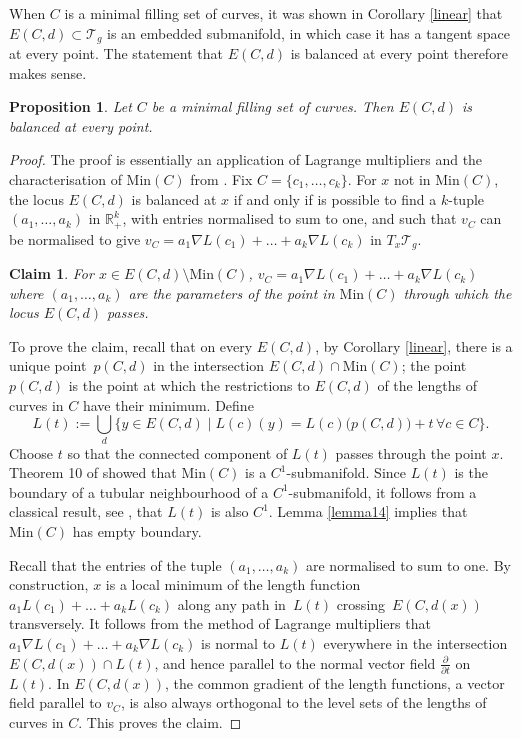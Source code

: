 \documentclass[11pt]{article}
\numberwithin{equation}{section}
\numberwithin{equation}{section}
\newtheorem{Proposition}[Theorem]{Proposition}
\newtheorem*{Claim}{Claim}
{ \theoremstyle{definition}
 \newtheorem{Definition}[Theorem]{Definition}
 \newtheorem{Note}[Theorem]{Note}
 \newtheorem{Example}[Theorem]{Example}
 \newtheorem{Remark}[Theorem]{Remark}
 \newtheorem{observation}[Theorem]{Observation}
}
\begin{document}
\begin{Remark}
When $C$ is a minimal filling set of curves, it was shown in Corollary \ref{linear} that~${E(C,d)\subset \mathcal{T}_{g}}$ is an embedded submanifold, in which case it has a tangent space at every point. The statement that $E(C,d)$ is balanced at every point therefore makes sense.
\end{Remark}
\begin{Proposition}
\label{balancedlem}
Let $C$ be a minimal filling set of curves. Then $E(C,d)$ is balanced at every point.
\end{Proposition}
\begin{proof}
The proof is essentially an application of Lagrange multipliers and the characterisation of $\mathrm{Min}(C)$ from \cite{SchmutzMorse}. Fix $C=\{c_{1}, \dots, c_{k}\}$. For $x$ not in $\mathrm{Min}(C)$, the locus $E(C,d)$ is balanced at $x$ if and only if is possible to find a $k$-tuple $(a_{1}, \dots, a_{k})$ in $\mathbb{R}_{+}^{k}$, with entries normalised to sum to one, and such that $v_{C}$ can be normalised to give $v_{C}=a_{1}\nabla L(c_{1})+\dots+a_{k}\nabla L(c_{k})$ in $T_{x}\mathcal{T}_{g}$.

\begin{Claim} For $x\in E(C,d)\setminus \mathrm{Min}(C)$, $v_{C}=a_{1}\nabla L(c_{1})+\dots+a_{k}\nabla L(c_{k})$ where $(a_{1}, \dots, a_{k})$ are the parameters of the point in $\mathrm{Min}(C)$ through which the locus $E(C,d)$ passes.
\end{Claim}

To prove the claim, recall that on every $E(C, d)$, by Corollary \ref{linear}, there is a unique point~$p(C,d)$ in the intersection $E(C,d)\cap\mathrm{Min}(C)$; the point $p(C,d)$ is the point at which the restrictions to $E(C,d)$ of the lengths of curves in $C$ have their minimum. Define
\begin{equation*}
 L(t):=\bigcup_{d}\{y\in E(C,d) \mid L(c)(y)=L(c)\bigl(p(C,d)\bigr)+t \, \forall c\in C\}.
\end{equation*}
Choose $t$ so that the connected component of $L(t)$ passes through the point $x$. Theorem 10 of \cite{SchmutzMorse} showed that $\mathrm{Min}(C)$ is a $C^{1}$-submanifold. Since $L(t)$ is the boundary of a tubular neighbourhood of a $C^{1}$-submanifold, it follows from a classical result, see \cite{Foote}, that $L(t)$ is also $C^{1}$. Lemma \ref{lemma14} implies that $\mathrm{Min}(C)$ has empty boundary.

Recall that the entries of the tuple $(a_{1}, \dots, a_{k})$ are normalised to sum to one. By construction, $x$ is a local minimum of the length function $a_{1}L(c_{1})+\dots+a_{k}L(c_{k})$ along any path in~$L(t)$ crossing~$E(C,d(x))$ transversely. It follows from the method of Lagrange multipliers that~${a_{1}\nabla L(c_{1})+\dots+a_{k}\nabla L(c_{k})}$ is normal to $L(t)$ everywhere in the intersection $E(C,d(x))\cap L(t)$, and hence parallel to the normal vector field $\frac{\partial}{\partial t}$ on $L(t)$. In $E(C,d(x))$, the common gradient of the length functions, a vector field parallel to $v_{C}$, is also always orthogonal to the level sets of the lengths of curves in $C$. This proves the claim.


\end{proof}
\end{document}
